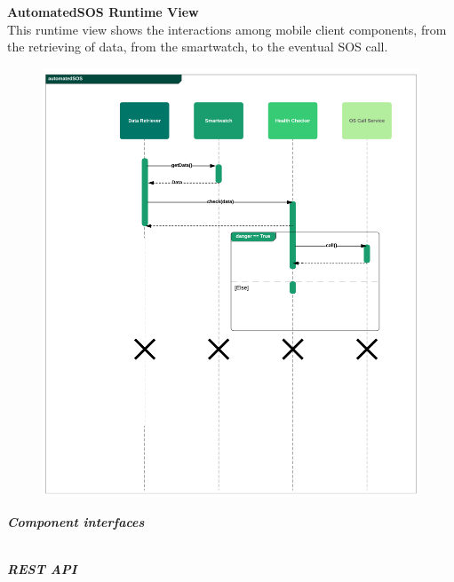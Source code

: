 \begin{legal}
\begin{legal}
				\newpage
				\item \textbf{AutomatedSOS Runtime View}\\
				This runtime view shows the interactions among mobile client components, from the retrieving of data, from the smartwatch, to the eventual SOS call.
				\begin{figure}[H]
				\includegraphics[width=\linewidth]{images/seq_diagrams/automatedSOSSeq.png}\\
				\end{figure}
			\end {legal}
		\newpage
		\item \textit{\textbf{Component interfaces}}\\\\
			\begin{legal} 
				\item \textit{\textbf{REST API}}\\\\

\end{legal}
\end{legal}
